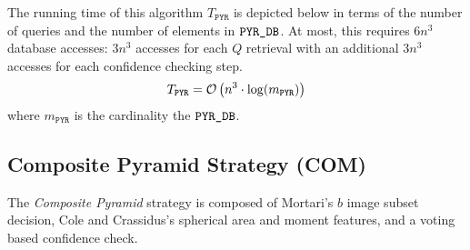 The running time of this algorithm $T_\texttt{PYR}$ is depicted below in terms of the number of queries and the number of elements in $\texttt{PYR\_DB}$.
At most, this requires $6n^3$ database accesses: $3n^3$ accesses for each $Q$ retrieval with an additional $3n^3$ accesses for each confidence checking step.
\begin{equation}
    T_{\texttt{PYR}} = \mathcal{O} \left( n^3 \cdot \log( m_\texttt{PYR} ) \right)
\end{equation}
where $m_\texttt{PYR}$ is the cardinality the $\texttt{PYR\_DB}$.



\subsection{Composite Pyramid Strategy (COM)}\label{subsec:compositePyramidMethod}
The \textit{Composite Pyramid} strategy is composed of Mortari's $b$ image subset decision, Cole and Crassidus's spherical area and moment features, and a voting based confidence check.

